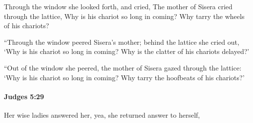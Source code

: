 			\begin{versebox}
					\item[BHS] 
					\item[ASV] Through the window she looked forth, and cried, The mother of Sisera cried through the lattice, Why is his chariot so long in coming? Why tarry the wheels of his chariots?
					\item[NIV] “Through the window peered Sisera’s mother; behind the lattice she cried out, ‘Why is his chariot so long in coming? Why is the clatter of his chariots delayed?’
					\item[NRSV] “Out of the window she peered, the mother of Sisera gazed through the lattice: ‘Why is his chariot so long in coming? Why tarry the hoofbeats of his chariots?’
			\end{versebox}

		\paragraph{Judges 5:29} %
			\label{JUDGES-5-29}

			Her wise ladies answered her, yea, she returned answer to herself,

